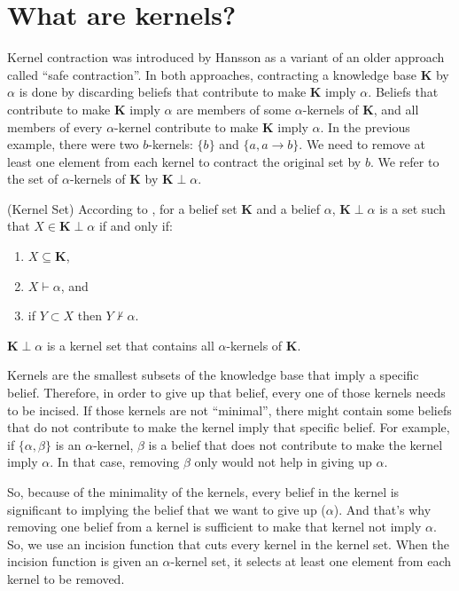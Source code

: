 \section{What are kernels?}
Kernel contraction was introduced by Hansson\cite{kernel} as a variant of an older approach called ``safe contraction''\cite{safe}. In both approaches, contracting a knowledge base \textbf{K} by $\alpha$ is done by discarding beliefs that contribute to make \textbf{K} imply $\alpha$. Beliefs that contribute to make \textbf{K} imply $\alpha$ are members of some $\alpha$-kernels of \textbf{K}, and all members of every $\alpha$-kernel contribute to make \textbf{K} imply $\alpha$. In the previous example, there were two $b$-kernels: $\lbrace b \rbrace$ and $\lbrace a, a \rightarrow b \rbrace$. We need to remove at least one element from each kernel to contract the original set by $b$. We refer to the set of $\alpha$-kernels of \textbf{K} by $\textbf{K} \perp \alpha$.
\begin{defn}(Kernel Set)
According to \cite{hansson}, for a belief set \textbf{K} and a belief $\alpha$, $\textbf{K} \perp \alpha$ is a set such that $X \in \textbf{K} \perp \alpha$ if and only if:
\begin{enumerate}
\item $X \subseteq \textbf{K}$,
\item $X \vdash \alpha$, and
\item if $Y \subset X$ then $Y \nvdash \alpha$.
\end{enumerate}
$\textbf{K} \perp \alpha$ is a kernel set that contains all $\alpha$-kernels of \textbf{K}.
\end{defn}
Kernels are the smallest subsets of the knowledge base that imply a specific belief. Therefore, in order to give up that belief, every one of those kernels needs to be incised. If those kernels are not ``minimal'', there might contain some beliefs that do not contribute to make the kernel imply that specific belief. For example, if $\lbrace \alpha, \beta \rbrace$ is an $\alpha$-kernel, $\beta$ is a belief that does not contribute to make the kernel imply $\alpha$. In that case, removing $\beta$ only would not help in giving up $\alpha$. 

So, because of the minimality of the kernels, every belief in the kernel is significant to implying the belief that we want to give up ($\alpha$). And that's why removing one belief from a kernel is sufficient to make that kernel not imply $\alpha$. So, we use an incision function that cuts every kernel in the kernel set. When the incision function is given an $\alpha$-kernel set, it selects at least one element from each kernel to be removed. 

